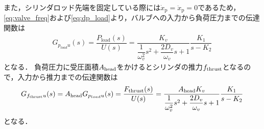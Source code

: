また，シリンダロッド先端を固定している際には$\dot{x}_\mathrm{p}=\ddot{x}_\mathrm{p}=0$であるため，\eqnname\eqref{eq:valve_freq}および\eqnname\eqref{eq:dp_load}より，バルブへの入力から負荷圧力までの伝達関数は
\begin{align}
    \label{eq:tf_Gpu}
    G_{p_{load} u} (s)= \dfrac{P_\mathrm{load}(s)}{U(s)} = \dfrac{K_v}{\dfrac{1}{\omega_v^2}s^2 + \dfrac{2D_v}{\omega_v}s + 1}\dfrac{K_1}{s-K_2}
\end{align}
となる．
負荷圧力に受圧面積$A_\mathrm{head}$をかけるとシリンダの推力$f_\mathrm{thrust}$となるので，入力から推力までの伝達関数は
\begin{align}
    \label{eq:tf_Gfthru}
    G_{f_\mathrm{thrust} u} (s)=A_\mathrm{head} G_{p_{load} u} (s)= \dfrac{F_\mathrm{thrust}(s)}{U(s)} =\dfrac{A_\mathrm{head} K_v}{\dfrac{1}{\omega_v^2}s^2 + \dfrac{2D_v}{\omega_v}s + 1}\dfrac{K_1}{s-K_2}
\end{align}
となる．
























